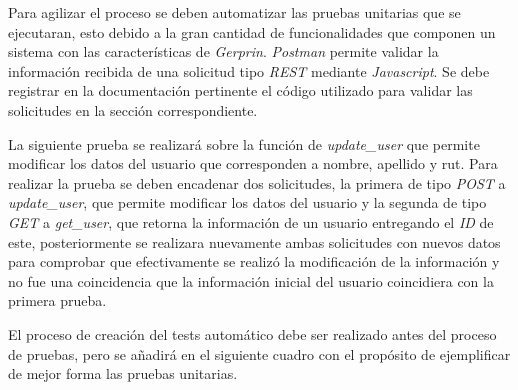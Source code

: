 Para agilizar el proceso se deben automatizar las pruebas unitarias que se ejecutaran, esto debido a la gran cantidad de funcionalidades que componen un sistema con las características de \textit{Gerprin}. \textit{Postman} permite validar la información recibida de una solicitud tipo \textit{REST} mediante \textit{Javascript}. Se debe registrar en la documentación pertinente el código utilizado para validar las solicitudes en la sección correspondiente.

La siguiente prueba se realizará sobre la función de \textit{update\_user} que permite modificar los datos del usuario que corresponden a nombre, apellido y rut. Para realizar la prueba se deben encadenar dos solicitudes, la primera de tipo \textit{POST} a \textit{update\_user}, que permite modificar los datos del usuario y la segunda de tipo \textit{GET} a \textit{get\_user}, que retorna la información de un usuario entregando el \textit{ID} de este, posteriormente se realizara nuevamente ambas solicitudes con nuevos datos para comprobar que efectivamente se realizó la modificación de la información y no fue una coincidencia que la información inicial del usuario coincidiera con la primera prueba.

El proceso de creación del tests automático debe ser realizado antes del proceso de pruebas, pero se añadirá en el siguiente cuadro con el propósito de ejemplificar de mejor forma las pruebas unitarias.

